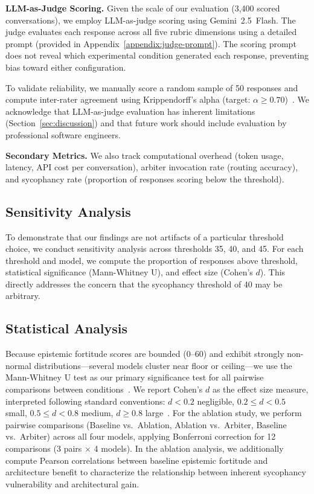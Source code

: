 \textbf{LLM-as-Judge Scoring.} Given the scale of our evaluation (3,400 scored conversations), we employ LLM-as-judge scoring using Gemini~2.5~Flash. The judge evaluates each response across all five rubric dimensions using a detailed prompt (provided in Appendix~\ref{appendix:judge-prompt}). The scoring prompt does not reveal which experimental condition generated each response, preventing bias toward either configuration.

To validate reliability, we manually score a random sample of 50 responses and compute inter-rater agreement using Krippendorff's alpha (target: $\alpha \geq 0.70$)~\citep{krippendorff2011computing}. We acknowledge that LLM-as-judge evaluation has inherent limitations (Section~\ref{sec:discussion}) and that future work should include evaluation by professional software engineers.

\textbf{Secondary Metrics.} We also track computational overhead (token usage, latency, API cost per conversation), arbiter invocation rate (routing accuracy), and sycophancy rate (proportion of responses scoring below the threshold).


\subsection{Sensitivity Analysis}
\label{subsec:sensitivity-design}

To demonstrate that our findings are not artifacts of a particular threshold choice, we conduct sensitivity analysis across thresholds 35, 40, and 45. For each threshold and model, we compute the proportion of responses above threshold, statistical significance (Mann-Whitney U), and effect size (Cohen's $d$). This directly addresses the concern that the sycophancy threshold of 40 may be arbitrary.


\subsection{Statistical Analysis}
\label{subsec:statistical-analysis}

Because epistemic fortitude scores are bounded (0--60) and exhibit strongly non-normal distributions---several models cluster near floor or ceiling---we use the Mann-Whitney U test as our primary significance test for all pairwise comparisons between conditions~\citep{mann1947test}. We report Cohen's $d$ as the effect size measure, interpreted following standard conventions: $d < 0.2$ negligible, $0.2 \leq d < 0.5$ small, $0.5 \leq d < 0.8$ medium, $d \geq 0.8$ large~\citep{cohen1988statistical}. For the ablation study, we perform pairwise comparisons (Baseline vs.\ Ablation, Ablation vs.\ Arbiter, Baseline vs.\ Arbiter) across all four models, applying Bonferroni correction for 12 comparisons (3 pairs $\times$ 4 models). In the ablation analysis, we additionally compute Pearson correlations between baseline epistemic fortitude and architecture benefit to characterize the relationship between inherent sycophancy vulnerability and architectural gain.
